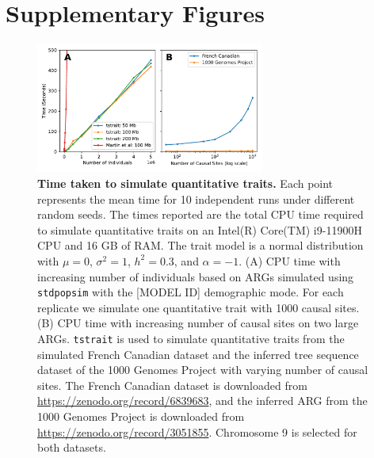 \documentclass[unnumsec,webpdf,modern,large,namedate]{oup-authoring-template}%
\begin{document}



\clearpage

\renewcommand\thefigure{S\arabic{figure}}
\setcounter{figure}{0}
\renewcommand\thetable{S\arabic{table}}
\setcounter{table}{0}
\section{Supplementary Figures}

\begin{figure}[t]%
\centering
\includegraphics[width=213pt]{figures/time-scaling.pdf}
\caption{\textbf{Time taken to simulate quantitative traits.} Each point
represents the mean time for 10 independent runs under different random seeds.
The times reported are the total CPU time required to simulate quantitative
traits on an Intel(R) Core(TM) i9-11900H CPU and 16 GB of RAM. The trait model
is a normal distribution with $\mu=0$, $\sigma^2=1$, $h^2=0.3$, and
$\alpha=-1$. (A) CPU time with increasing number of individuals
based on ARGs simulated using \texttt{stdpopsim} with the [MODEL ID]
demographic mode. For each replicate we simulate
one quantitative trait with 1000 causal sites.
(B) CPU time with increasing number of causal sites on two large ARGs.
\texttt{tstrait} is used to simulate quantitative traits from
the simulated French Canadian dataset \citep{anderson2023} and the inferred
tree sequence dataset of the 1000 Genomes Project \citep{kelleher2019} with
varying number of causal sites. The French Canadian dataset is downloaded from
\url{https://zenodo.org/record/6839683}, and the inferred ARG from the 1000
Genomes Project is downloaded from \url{https://zenodo.org/record/3051855}.
Chromosome 9 is selected for both datasets.}\label{fig:time}
\end{figure}
\end{document}
